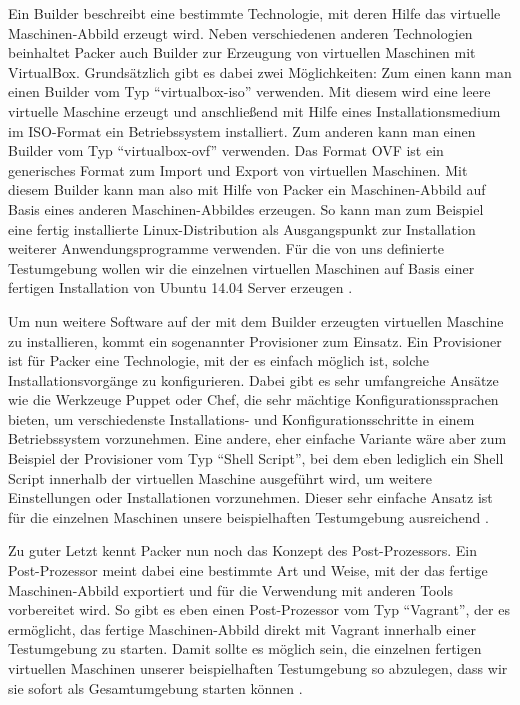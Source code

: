 Ein Builder beschreibt eine bestimmte Technologie, mit deren Hilfe das virtuelle Maschinen-Abbild erzeugt wird. Neben verschiedenen anderen Technologien beinhaltet Packer auch Builder zur Erzeugung von virtuellen Maschinen mit VirtualBox. Grundsätzlich gibt es dabei zwei Möglichkeiten: Zum einen kann man einen Builder vom Typ "`virtualbox-iso"' verwenden. Mit diesem wird eine leere virtuelle Maschine erzeugt und anschließend mit Hilfe eines Installationsmedium im ISO-Format ein Betriebssystem installiert. Zum anderen kann man einen Builder vom Typ "`virtualbox-ovf"' verwenden. Das Format OVF ist ein generisches Format zum Import und Export von virtuellen Maschinen. Mit diesem Builder kann man also mit Hilfe von Packer ein Maschinen-Abbild auf Basis eines anderen Maschinen-Abbildes erzeugen. So kann man zum Beispiel eine fertig installierte Linux-Distribution als Ausgangspunkt zur Installation weiterer Anwendungsprogramme verwenden. Für die von uns definierte Testumgebung wollen wir die einzelnen virtuellen Maschinen auf Basis einer fertigen Installation von Ubuntu 14.04 Server erzeugen \citep[Vgl.][]{Packer:001}.

Um nun weitere Software auf der mit dem Builder erzeugten virtuellen Maschine zu installieren, kommt ein sogenannter Provisioner zum Einsatz. Ein Provisioner ist für Packer eine Technologie, mit der es einfach möglich ist, solche Installationsvorgänge zu konfigurieren. Dabei gibt es sehr umfangreiche Ansätze wie die Werkzeuge Puppet oder Chef, die sehr mächtige Konfigurationssprachen bieten, um verschiedenste Installations- und Konfigurationsschritte in einem Betriebssystem vorzunehmen. Eine andere, eher einfache Variante wäre aber zum Beispiel der Provisioner vom Typ "`Shell Script"', bei dem eben lediglich ein Shell Script innerhalb der virtuellen Maschine ausgeführt wird, um weitere Einstellungen oder Installationen vorzunehmen. Dieser sehr einfache Ansatz ist für die einzelnen Maschinen unsere beispielhaften Testumgebung ausreichend \citep[Vgl.][]{Packer:002}.

Zu guter Letzt kennt Packer nun noch das Konzept des Post-Prozessors. Ein Post-Prozessor meint dabei eine bestimmte Art und Weise, mit der das fertige Maschinen-Abbild exportiert und für die Verwendung mit anderen Tools vorbereitet wird. So gibt es eben einen Post-Prozessor vom Typ "`Vagrant"', der es ermöglicht, das fertige Maschinen-Abbild direkt mit Vagrant innerhalb einer Testumgebung zu starten. Damit sollte es möglich sein, die einzelnen fertigen virtuellen Maschinen unserer beispielhaften Testumgebung so abzulegen, dass wir sie sofort als Gesamtumgebung starten können \citep[Vgl.][]{Packer:003}.

